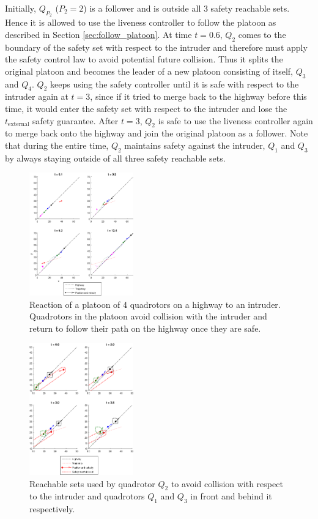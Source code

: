 Initially, $Q_{P_2}$ ($P_2=2$) is a follower and is outside all 3 safety reachable sets. Hence it is allowed to use the liveness controller to follow the platoon as described in Section \ref{sec:follow_platoon}. At time $t=0.6$, $Q_2$ comes to the boundary of the safety set with respect to the intruder and therefore must apply the safety control law to avoid potential future collision. Thus it splits the original platoon and becomes the leader of a new platoon consisting of itself, $Q_3$ and $Q_4$. $Q_2$ keeps using the safety controller until it is safe with respect to the intruder again at $t=3$, since if it tried to merge back to the highway before this time, it would enter the safety set with respect to the intruder and lose the $t_\text{external}$ safety guarantee. After $t=3$, $Q_2$ is safe to use the liveness controller again to merge back onto the highway and join the original platoon as a follower. Note that during the entire time, $Q_2$ maintains safety against the intruder, $Q_1$ and $Q_3$ by always staying outside of all three safety reachable sets.


\begin{figure}
	\centering
	\includegraphics[width=0.4\textwidth]{"fig/Intruder1"}
	\caption{Reaction of a platoon of 4 quadrotors on a highway to an intruder. Quadrotors in the platoon avoid collision with the intruder and return to follow their path on the highway once they are safe.}
	\label{fig:intruder1}
\end{figure}

\begin{figure}
	\centering
		\includegraphics[width=0.4\textwidth]{"fig/intruder2"}
	\caption{Reachable sets used by quadrotor $Q_2$ to avoid collision with respect to the intruder and quadrotors $Q_1$ and $Q_3$ in front and behind it respectively.}
	\label{fig:intruder2}
\end{figure}

